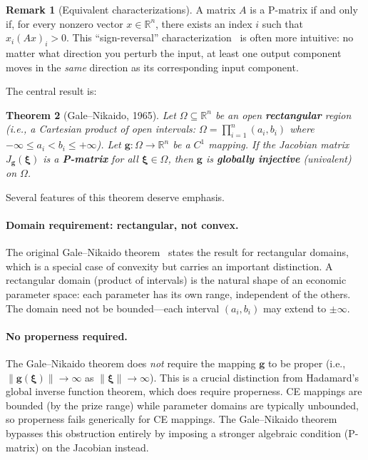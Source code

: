\documentclass[11pt,a4paper]{article}
\newtheorem{theorem}{Theorem}[section]
\theoremstyle{definition}
\newtheorem{remark}[theorem]{Remark}
\newcommand{\R}{\mathbb{R}}
\newcommand{\bxi}{\boldsymbol{\xi}}
\begin{document}
\begin{remark}[Equivalent characterizations]
\label{rem:p_matrix_equiv}
A matrix $A$ is a P-matrix if and only if, for every nonzero vector
$x \in \R^n$, there exists an index $i$ such that $x_i (Ax)_i > 0$.
This ``sign-reversal'' characterization~\cite{gale_nikaido_1965} is often
more intuitive: no matter what direction you perturb the input, at least one
output component moves in the \emph{same} direction as its corresponding
input component.
\end{remark}

The central result is:

\begin{theorem}[Gale--Nikaido, 1965]
\label{thm:gale_nikaido}
Let $\Omega \subseteq \R^n$ be an open \textbf{rectangular} region (i.e., a
Cartesian product of open intervals: $\Omega = \prod_{i=1}^n (a_i, b_i)$
where $-\infty \leq a_i < b_i \leq +\infty$). Let $\mathbf{g}: \Omega \to \R^n$
be a $C^1$ mapping. If the Jacobian matrix $J_{\mathbf{g}}(\bxi)$ is a
\textbf{P-matrix} for all $\bxi \in \Omega$, then $\mathbf{g}$ is
\textbf{globally injective} (univalent) on $\Omega$.
\end{theorem}

Several features of this theorem deserve emphasis.

\paragraph{Domain requirement: rectangular, not convex.}
The original Gale--Nikaido theorem~\cite{gale_nikaido_1965} states the result
for rectangular domains, which is a special case of convexity but carries an
important distinction. A rectangular domain (product of intervals) is the
natural shape of an economic parameter space: each parameter has its own range,
independent of the others. The domain need not be bounded---each interval
$(a_i, b_i)$ may extend to $\pm\infty$.

\paragraph{No properness required.}
The Gale--Nikaido theorem does \emph{not} require the mapping $\mathbf{g}$ to be
proper (i.e., $\|\mathbf{g}(\bxi)\| \to \infty$ as $\|\bxi\| \to \infty$).
This is a crucial distinction from Hadamard's global inverse function theorem,
which does require properness. CE mappings are bounded (by the prize range)
while parameter domains are typically unbounded, so properness fails
generically for CE mappings. The Gale--Nikaido theorem bypasses this
obstruction entirely by imposing a stronger algebraic condition (P-matrix) on
the Jacobian instead.
\end{document}
